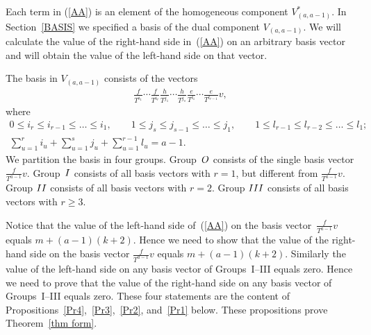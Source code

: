 \documentclass[11pt]{article}
\numberwithin{equation}{section}
\begin{document}
Each term in (\ref{AA}) is an element of the homogeneous component $V^*_{(a,a-1)}$. In Section~\ref{BASIS} we specified a basis of the dual component $V_{(a,a-1)}$. We will calculate the value of the right-hand side in~(\ref{AA}) on an arbitrary basis vector and will obtain the value of the left-hand side on that vector.

The basis in $V_{(a,a-1)}$ consists of the vectors
\begin{gather*}
\frac{f}{T^{i_1}}\cdots\frac{f}{T^{i_r}} \frac{h}{T^{j_1}}\cdots\frac{h}{T^{j_s}} \frac{e}{T^{l_1}}\cdots\frac{e}{T^{l_{r-1}}}v, %
\end{gather*}
where
\begin{gather*}
0\leq i_r\leq i_{r-1}\leq\dots\leq i_1, \qquad 1\leq j_s\leq j_{s-1}\leq\dots\leq j_1,\qquad 1\leq l_{r-1}\leq l_{r-2}\leq\dots\leq l_1;\nonumber\\
 \sum_{u=1}^r i_u + \sum_{u=1}^s j_u + \sum_{u=1}^{r-1} l_u = a-1. %
\end{gather*}
We partition the basis in four groups. Group~${\rm O}$ consists of the single basis vector $\frac{f}{T^{a-1}}v$. Group~${\rm I}$ consists of all basis vectors with $r=1$, but different from $\frac{f}{T^{a-1}}v$. Group ${\rm II}$ consists of all basis vectors with $r=2$. Group ${\rm III}$ consists of all basis vectors with $r\geq 3$.

Notice that the value of the left-hand side of~(\ref{AA}) on the basis vector~$\frac{f}{T^{a-1}}v$ equals $m + (a-1)(k+2)$. Hence we need to show that the value of the right-hand side on the basis vector $\frac{f}{T^{a-1}}v$ equals $m + (a-1)(k+2)$. Similarly the value of the left-hand side on any basis vector of Groups~\mbox{I--III} equals zero. Hence we need
to prove that the value of the right-hand side on any basis vector of Groups~I--III equals zero. These four statements are the content of Propositions~\ref{Pr4},~\ref{Pr3},~\ref{Pr2}, and~\ref{Pr1} below. These propositions prove Theorem~\ref{thm form}.
\end{document}
